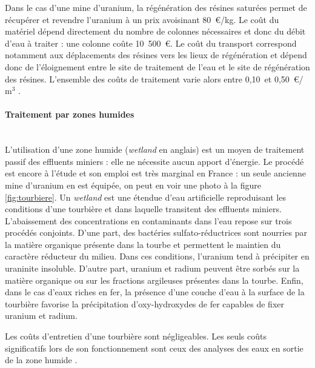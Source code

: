 \documentclass{article}
\begin{document}

Dans le cas d’une mine d’uranium, la régénération des résines saturées permet de récupérer et revendre l’uranium à un prix avoisinant 80~\euro{}/kg. Le coût du matériel dépend directement du nombre de colonnes nécessaires et donc du débit d’eau à traiter : une colonne coûte 10~500~\euro{}. Le coût du transport correspond notamment aux déplacements des résines vers les lieux de régénération et dépend donc de l’éloignement entre le site de traitement de l’eau et le site de régénération des résines. L’ensemble des coûts de traitement varie alors entre 0,10~et 0,50~\euro{}/$\text{m}^3$ \cite{schick_informations_2020}.

\paragraph{Traitement par zones humides \\ \\}

L’utilisation d’une zone humide (\textit{wetland} en anglais) est un moyen de traitement passif des effluents miniers : elle ne nécessite aucun apport d'énergie. Le procédé est encore à l’étude et son emploi est très marginal en France : un seule ancienne mine d'uranium en est équipée, on peut en voir une photo à la figure \ref{fig:tourbiere}. Un \textit{wetland} est une étendue d’eau artificielle reproduisant les conditions d’une tourbière et dans laquelle transitent des effluents miniers. L’abaissement des concentrations en contaminants dans l’eau repose sur trois procédés conjoints. D’une part, des bactéries sulfato-réductrices sont nourries par la matière organique présente dans la tourbe et permettent le maintien du caractère réducteur du milieu. Dans ces conditions, l’uranium tend à précipiter en uraninite insoluble. D’autre part, uranium et radium peuvent être sorbés sur la matière organique ou sur les fractions argileuses présentes dans la tourbe. Enfin, dans le cas d'eaux riches en fer, la présence d’une couche d’eau à la surface de la tourbière favorise la précipitation d’oxy-hydroxydes de fer capables de fixer uranium et radium.

Les coûts d’entretien d’une tourbière sont négligeables. Les seuls coûts significatifs lors de son fonctionnement sont ceux des analyses des eaux en sortie de la zone humide \cite{schick_informations_2020}.

\end{document}
